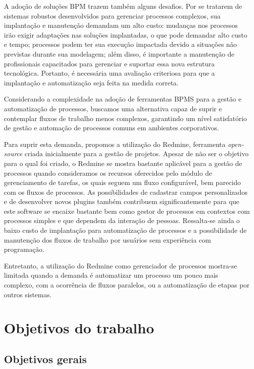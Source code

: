 A adoção de soluções BPM trazem também alguns desafios. Por se tratarem de sistemas robustos desenvolvidos para gerenciar processos complexos, sua implantação e manutenção demandam um alto custo: mudanças nos processos irão exigir adaptações nas soluções implantadas, o que pode demandar alto custo e tempo; processos podem ter sua execução impactada devido a situações não previstas durante sua modelagem; além disso, é importante a manutenção de profissionais capacitados para gerenciar e suportar essa nova estrutura tecnológica. Portanto, é necessária uma avaliação criteriosa para que a implantação e automatização seja feita na medida correta.

Considerando a complexidade na adoção de ferramentas BPMS para a gestão e automatização de processos, buscamos uma alternativa capaz de suprir e contemplar fluxos de trabalho menos complexos, garantindo um nível satisfatório de gestão e automação de processos comuns em ambientes corporativos.

Para suprir esta demanda, propomos a utilização do Redmine, ferramenta \textit{open-source} criada inicialmente para a gestão de projetos. Apesar de não ser o objetivo para o qual foi criado, o Redmine se mostra bastante aplicável para a gestão de processos quando consideramos os recursos oferecidos pelo módulo de gerenciamento de tarefas, os quais seguem um fluxo configurável, bem parecido com os fluxos de processos. As possibilidades de cadastrar campos personalizados e de desenvolver novos plugins também contribuem significantemente para que este software se encaixe bastante bem como gestor de processos em contextos com processos simples e que dependem da interação de pessoas. Ressalta-se ainda o baixo custo de implantação para automatização de processos e a possibilidade de manutenção dos fluxos de trabalho por usuários sem experiência com programação.

Entretanto, a utilização do Redmine como gerenciador de processos mostra-se limitada quando a demanda é automatizar um processo um pouco mais complexo, com a ocorrência de fluxos paralelos, ou a automatização de etapas por outros sistemas.

\section{Objetivos do trabalho}\label{sec:introducao-objetivos}

\subsection{Objetivos gerais}\label{sec:introducao-objetivos-gerais}

